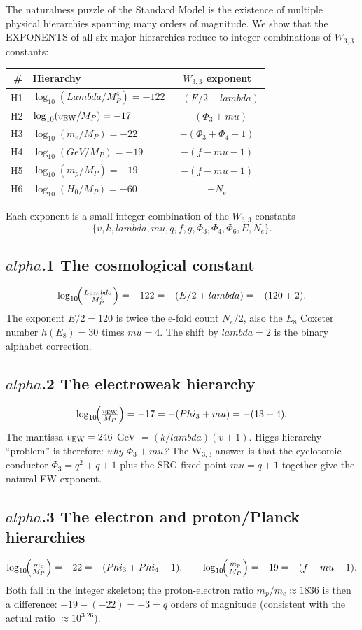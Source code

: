 \documentclass[12pt,a4paper]{article}
\def\text#1{#1}%
\def\alpha{alpha}%
\def\lambda{lambda}%
\def\Lambda{Lambda}%
\def\mu{mu}%
\def\Phi#1{Phi#1}%
\theoremstyle{definition}
\begin{document}
The naturalness puzzle of the Standard Model is the existence of
multiple physical hierarchies spanning many orders of magnitude. We
show that the EXPONENTS of all six major hierarchies reduce to
integer combinations of $W_{3,3}$ constants:
\begin{center}
\renewcommand{\arraystretch}{1.4}
\begin{tabular}{rlc}
\toprule
\# & Hierarchy & $W_{3,3}$ exponent \\
\midrule
H1 & $\log_{10}(\Lambda/M_P^4) = -122$ & $-(E/2 + \lambda)$ \\
H2 & $\log_{10}(v_{\rm EW}/M_P) = -17$ & $-(\Phi_3 + \mu)$ \\
H3 & $\log_{10}(m_e/M_P) = -22$ & $-(\Phi_3 + \Phi_4 - 1)$ \\
H4 & $\log_{10}(\text{GeV}/M_P) = -19$ & $-(f - \mu - 1)$ \\
H5 & $\log_{10}(m_p/M_P) = -19$ & $-(f - \mu - 1)$ \\
H6 & $\log_{10}(H_0/M_P) = -60$ & $-N_e$ \\
\bottomrule
\end{tabular}
\end{center}

Each exponent is a small integer combination of the $W_{3,3}$ constants
\[
\{v,k,\lambda,\mu,q,f,g,\Phi_3,\Phi_4,\Phi_6,E,N_e\}.
\]

\subsection*{$\alpha$.1 \quad The cosmological constant}
\[
\log_{10}\!\Bigl(\tfrac{\Lambda}{M_P^4}\Bigr) = -122 = -(E/2 + \lambda) = -(120 + 2).
\]
The exponent $E/2 = 120$ is twice the e-fold count $N_e/2$, also the
$E_8$ Coxeter number $h(E_8) = 30$ times $\mu = 4$. The
shift by $\lambda=2$ is the binary alphabet correction.

\subsection*{$\alpha$.2 \quad The electroweak hierarchy}
\[
\log_{10}\!\Bigl(\tfrac{v_{\rm EW}}{M_P}\Bigr) = -17 = -(\Phi_3 + \mu) = -(13 + 4).
\]
The mantissa $v_{\rm EW} = 246$ GeV $= (k/\lambda)(v+1)$. Higgs hierarchy
``problem'' is therefore: \emph{why $\Phi_3+\mu$?} The W$_{3,3}$ answer
is that the cyclotomic conductor $\Phi_3=q^2+q+1$ plus the SRG fixed
point $\mu=q+1$ together give the natural EW exponent.

\subsection*{$\alpha$.3 \quad The electron and proton/Planck hierarchies}
\[
\log_{10}\!\Bigl(\tfrac{m_e}{M_P}\Bigr) = -22 = -(\Phi_3 + \Phi_4 - 1),
\qquad
\log_{10}\!\Bigl(\tfrac{m_p}{M_P}\Bigr) = -19 = -(f - \mu - 1).
\]
Both fall in the integer skeleton; the proton-electron ratio
$m_p/m_e \approx 1836$ is then a difference: $-19 - (-22) = +3 = q$
orders of magnitude (consistent with the actual ratio $\approx 10^{3.26}$).
\end{document}
